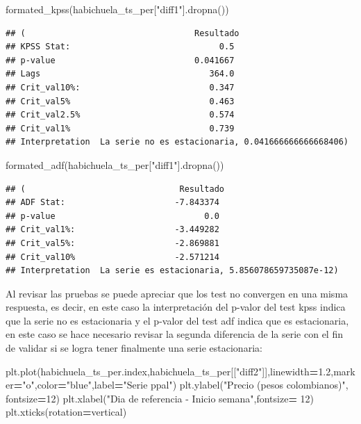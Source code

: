 \documentclass[
]{book}
\newenvironment{Shaded}{\begin{snugshade}}{\end{snugshade}}
\newcommand{\DecValTok}[1]{\textcolor[rgb]{0.00,0.00,0.81}{#1}}
\newcommand{\FloatTok}[1]{\textcolor[rgb]{0.00,0.00,0.81}{#1}}
\newcommand{\NormalTok}[1]{#1}
\newcommand{\OperatorTok}[1]{\textcolor[rgb]{0.81,0.36,0.00}{\textbf{#1}}}
\newcommand{\StringTok}[1]{\textcolor[rgb]{0.31,0.60,0.02}{#1}}
\begin{document}
\begin{Shaded}
\begin{Highlighting}[]

\NormalTok{formated\_kpss(habichuela\_ts\_per[}\StringTok{"diff1"}\NormalTok{].dropna())}
\end{Highlighting}
\end{Shaded}

\begin{verbatim}
## (                                  Resultado
## KPSS Stat:                              0.5
## p-value                            0.041667
## Lags                                  364.0
## Crit_val10%:                          0.347
## Crit_val5%                            0.463
## Crit_val2.5%                          0.574
## Crit_val1%                            0.739
## Interpretation  La serie no es estacionaria, 0.041666666666668406)
\end{verbatim}

\begin{Shaded}
\begin{Highlighting}[]
\NormalTok{formated\_adf(habichuela\_ts\_per[}\StringTok{"diff1"}\NormalTok{].dropna())}
\end{Highlighting}
\end{Shaded}

\begin{verbatim}
## (                               Resultado
## ADF Stat:                      -7.843374
## p-value                              0.0
## Crit_val1%:                    -3.449282
## Crit_val5%:                    -2.869881
## Crit_val10%                    -2.571214
## Interpretation  La serie es estacionaria, 5.856078659735087e-12)
\end{verbatim}

Al revisar las pruebas se puede apreciar que los test no convergen en una misma respuesta, es decir, en este caso la interpretación del p-valor del test kpss indica que la serie no es estacionaria y el p-valor del test adf indica que es estacionaria, en este caso se hace necesario revisar la segunda diferencia de la serie con el fin de validar si se logra tener finalmente una serie estacionaria:

\begin{Shaded}
\begin{Highlighting}[]

\NormalTok{plt.plot(habichuela\_ts\_per.index,habichuela\_ts\_per[[}\StringTok{"diff2"}\NormalTok{]],linewidth}\OperatorTok{=}\FloatTok{1.2}\NormalTok{,marker}\OperatorTok{=}\StringTok{"o"}\NormalTok{,color}\OperatorTok{=}\StringTok{"blue"}\NormalTok{,label}\OperatorTok{=}\StringTok{"Serie ppal"}\NormalTok{)}
\NormalTok{plt.ylabel(}\StringTok{"Precio (pesos colombianos)"}\NormalTok{, fontsize}\OperatorTok{=}\DecValTok{12}\NormalTok{)}
\NormalTok{plt.xlabel(}\StringTok{"Dia de referencia {-} Inicio semana"}\NormalTok{,fontsize}\OperatorTok{=} \DecValTok{12}\NormalTok{)}
\NormalTok{plt.xticks(rotation}\OperatorTok{=}\StringTok{\textquotesingle{}vertical\textquotesingle{}}\NormalTok{)}
\end{Highlighting}
\end{Shaded}
\end{document}
